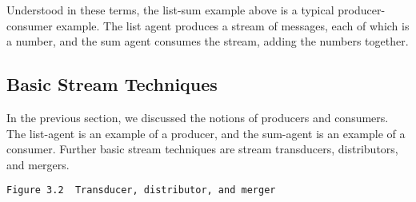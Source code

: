 Understood in these terms, the list-sum example above is a typical
pro\-ducer-con\-sumer example.  The list agent produces a stream of
messages, each of which is a number, and the sum agent consumes the
stream, adding the numbers together.

\subsection{Basic Stream Techniques}

In the previous section, we discussed the notions of producers and
consumers.  The list-agent is an example of a producer, and the
sum-agent is an example of a consumer.  Further basic stream techniques
are stream transducers, distributors, and mergers.
                                          
\verb|Figure 3.2  Transducer, distributor, and merger|

